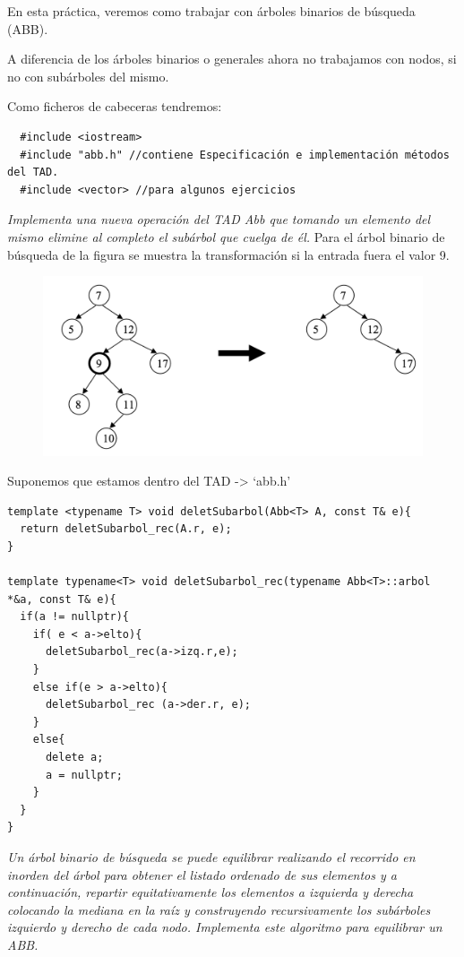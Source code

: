 En esta práctica, veremos como trabajar con árboles binarios de búsqueda (ABB).

A diferencia de los árboles binarios o generales ahora no trabajamos con nodos, si no con subárboles del mismo.

Como ficheros de cabeceras tendremos:
\begin{verbatim}
  #include <iostream>
  #include "abb.h" //contiene Especificación e implementación métodos del TAD.
  #include <vector> //para algunos ejercicios
\end{verbatim}

\newpage
\textbf{\large{}}\textit{ Implementa una nueva operación del TAD Abb que tomando un elemento del mismo elimine al completo el subárbol que cuelga de él.}
 Para el árbol binario de búsqueda de la figura se muestra la transformación si la entrada fuera el valor 9.
\begin{figure}[h]
  \begin{center}
    \includegraphics*[width=.7\textwidth]{assets/Abb1.png}
  \end{center}
\end{figure}

Suponemos que estamos dentro del TAD -> `abb.h'
\begin{verbatim}
template <typename T> void deletSubarbol(Abb<T> A, const T& e){
  return deletSubarbol_rec(A.r, e);
}

template typename<T> void deletSubarbol_rec(typename Abb<T>::arbol *&a, const T& e){
  if(a != nullptr){
    if( e < a->elto){
      deletSubarbol_rec(a->izq.r,e);
    }
    else if(e > a->elto){
      deletSubarbol_rec (a->der.r, e);
    }
    else{
      delete a;
      a = nullptr;
    }
  }
}
\end{verbatim}

\textbf{\large{}}\textit{ Un árbol binario de búsqueda se puede equilibrar realizando el recorrido en inorden del árbol para obtener el listado ordenado de sus elementos y a continuación, repartir equitativamente los elementos a izquierda y derecha colocando la mediana en la raíz y construyendo recursivamente los subárboles izquierdo y derecho de cada nodo. Implementa este algoritmo para equilibrar un ABB.}

